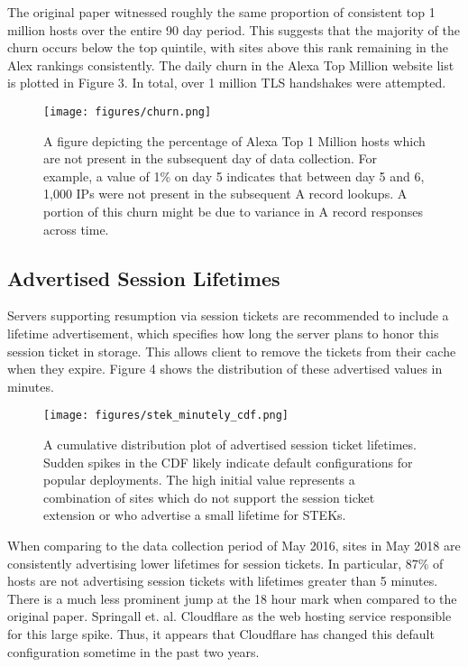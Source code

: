 The original paper witnessed roughly the same proportion of consistent top 1 million hosts over the entire 90 day period. This suggests that the majority of the churn occurs below the top quintile, with sites above this rank remaining in the Alex rankings consistently. The daily churn in the Alexa Top Million website list is plotted in Figure 3. In total, over 1 million TLS handshakes were attempted. 


\begin{figure}
\centering
\texttt{[image: figures/churn.png]}
\caption{A figure depicting the percentage of Alexa Top 1 Million hosts which are not present in the subsequent day of data collection. For example, a value of 1\% on day 5 indicates that between day 5 and 6, 1,000 IPs were not present in the subsequent A record lookups. A portion of this churn might be due to variance in A record responses across time.}
\end{figure}



\subsection{Advertised Session Lifetimes}
Servers supporting resumption via session tickets are recommended to include a lifetime advertisement, which specifies how long the server plans to honor this session ticket in storage. This allows client to remove the tickets from their cache when they expire. Figure 4 shows the distribution of these advertised values in minutes.

\begin{figure}
\centering
\texttt{[image: figures/stek\_minutely\_cdf.png]}
\caption{A cumulative distribution plot of advertised session ticket lifetimes. Sudden spikes in the CDF likely indicate default configurations for popular deployments. The high initial value represents a combination of sites which do not support the session ticket extension or who advertise a small lifetime for STEKs.}
\end{figure}

When comparing to the data collection period of May 2016, sites in May 2018 are consistently advertising lower lifetimes for session tickets. In particular, 87\% of hosts are not advertising session tickets with lifetimes greater than 5 minutes. There is a much less prominent jump at the 18 hour mark when compared to the original paper. Springall et. al. Cloudflare as the web hosting service responsible for this large spike. Thus, it appears that Cloudflare has changed this default configuration sometime in the past two years.

